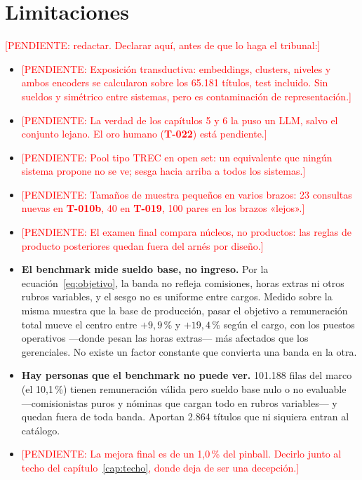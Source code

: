 \documentclass[12pt,a4paper,oneside]{report}
\newcommand{\pend}[1]{\textcolor{red}{\small[PENDIENTE: #1]}}
\newcommand{\tref}[1]{\textbf{T-#1}}
\begin{document}
\chapter{Limitaciones}
\label{cap:limitaciones}

\pend{redactar. Declarar aquí, antes de que lo haga el tribunal:}

\begin{itemize}[leftmargin=2em]
  \item \pend{Exposición transductiva: embeddings, clusters, niveles y ambos encoders se
    calcularon sobre los 65.181 títulos, test incluido. Sin sueldos y simétrico entre
    sistemas, pero es contaminación de representación.}
  \item \pend{La verdad de los capítulos 5 y 6 la puso un LLM, salvo el conjunto lejano.
    El oro humano (\tref{022}) está pendiente.}
  \item \pend{Pool tipo TREC en open set: un equivalente que ningún sistema propone no se
    ve; sesga hacia arriba a todos los sistemas.}
  \item \pend{Tamaños de muestra pequeños en varios brazos: 23 consultas nuevas en
    \tref{010b}, 40 en \tref{019}, 100 pares en los brazos «lejos».}
  \item \pend{El examen final compara núcleos, no productos: las reglas de producto
    posteriores quedan fuera del arnés por diseño.}
  \item \textbf{El benchmark mide sueldo base, no ingreso.} Por la
    ecuación~\eqref{eq:objetivo}, la banda no refleja comisiones, horas extras ni otros
    rubros variables, y el sesgo no es uniforme entre cargos. Medido sobre la misma
    muestra que la base de producción, pasar el objetivo a remuneración total mueve el centro entre $+9{,}9\,\%$ y
    $+19{,}4\,\%$ según el cargo, con los puestos operativos —donde pesan las horas
    extras— más afectados que los gerenciales. No existe un factor constante que convierta
    una banda en la otra.
  \item \textbf{Hay personas que el benchmark no puede ver.} 101.188 filas del marco
    (el 10,1\,\%) tienen remuneración válida pero sueldo base nulo o no evaluable
    —comisionistas puros y nóminas que cargan todo en rubros variables— y quedan fuera de
    toda banda. Aportan 2.864 títulos que ni siquiera entran al catálogo.
  \item \pend{La mejora final es de un 1,0\,\% del pinball. Decirlo junto al techo del
    capítulo~\ref{cap:techo}, donde deja de ser una decepción.}
\end{itemize}
\end{document}
